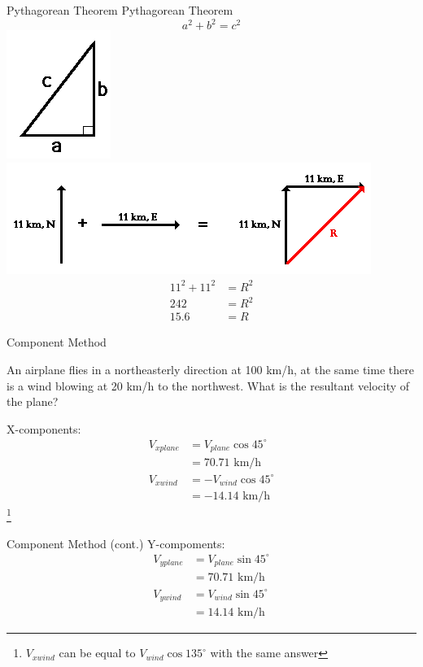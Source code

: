 \documentclass{beamer}
\newcommand\blfootnote[1]{%
	\begingroup
	\renewcommand\thefootnote{}\footnote{#1}%
	\addtocounter{footnote}{-1}%
	\endgroup
}
\begin{document}
\begin{frame}{Pythagorean Theorem}
	Pythagorean Theorem
	\begin{equation}
		 a^2 + b^2 = c^2
	\end{equation}
	\includegraphics[scale=0.3]{pytha.png}  \\
	\includegraphics[scale=0.3]{pythaexample.png}
	\centering 
	\begin{align*}
		11^2 + 11^2 &= R^2\\
		242 &= R^2\\
		15.6 &= R
	\end{align*}
	
\end{frame}

\begin{frame}{Component Method}
	\begin{example}
		An airplane flies in a northeasterly direction at 100 km/h, at the same time there is a wind blowing at 20 km/h to the northwest. What is the resultant velocity of the plane?
	\end{example}
	X-components:
	\begin{align*}
		V_{xplane} &= V_{plane} \cos 45^\circ \\
		&= 70.71 \text{ km/h}	\\
		V_{xwind} &= -V_{wind}  \cos 45^\circ \\
		&= -14.14 \text{ km/h}
	\end{align*}
	\blfootnote{$V_{xwind}$ can be equal to $V_{wind} \cos 135^\circ$ with the same answer}
\end{frame}

\begin{frame}{Component Method (cont.)}
	Y-compoments:
	\begin{align*}
		V_{yplane} &= V_{plane} \sin 45^\circ \\
		&= 70.71 \text{ km/h} \\
		V_{ywind} &= V_{wind}  \sin 45^\circ \\
		&= 14.14 \text{ km/h}
	\end{align*}

\end{frame}
\end{document}
